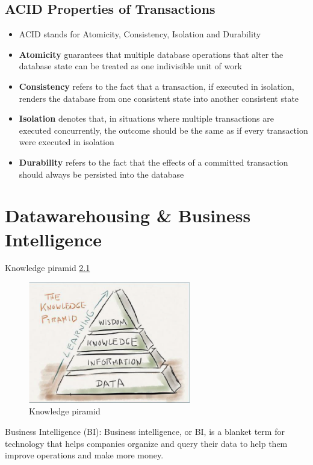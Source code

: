 \documentclass{report}
\begin{document}
    \section{ACID Properties of Transactions}
    \begin{itemize}
        \item ACID stands for Atomicity, Consistency, Isolation and Durability
        \item \textbf{Atomicity} guarantees that multiple database operations that alter the database state can be treated as one indivisible unit of work
        \item \textbf{Consistency} refers to the fact that a transaction, if executed in isolation, renders the database from one consistent state into another consistent state
        \item \textbf{Isolation} denotes that, in situations where multiple transactions are executed concurrently, the outcome should be the same as if every transaction were executed in isolation
        \item \textbf{Durability} refers to the fact that the effects of a
        committed transaction should always be persisted into
        the database
    \end{itemize}
{\let\clearpage\relax \chapter{Datawarehousing \& Business Intelligence}}
    Knowledge piramid \ref{fig:knowledge-piramid}
    \begin{figure}
        \includegraphics[width=200pt]{./images/knowledge-piramid.png}
        \caption{\label{fig:knowledge-piramid}Knowledge piramid}
    \end{figure}
    Business Intelligence (BI): Business intelligence, or BI, is a blanket term for technology that helps companies organize and query their data to help them improve operations and make more money.
    
\end{document}
